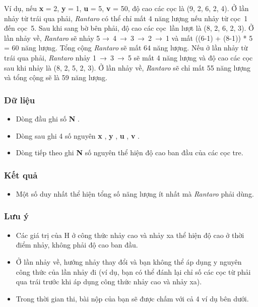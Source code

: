    Ví dụ, nếu   \textbf{    x   }   = 2,   \textbf{    y   }   = 1,   \textbf{    u   }   = 5,   \textbf{    v   }   = 50, độ cao các cọc là (9, 2, 6, 2, 4). Ở lần nhảy từ trái qua phải,   \emph{    Rantaro   }   có thể chỉ mất 4 năng lượng nếu nhảy từ cọc 1 đến cọc 5. Sau khi sang bờ bên phải, độ cao các cọc lần lượt là (8, 2, 6, 2, 3). Ở lần nhảy về,   \emph{    Rantaro   }   sẽ nhảy 5 → 4 → 3 → 2 → 1 và mất ((6-1) + (8-1)) * 5 = 60 năng lượng. Tổng cộng   \emph{    Rantaro   }   sẽ mất 64 năng lượng. Nếu ở lần nhảy từ trái qua phải,   \emph{    Rantaro   }   nhảy 1 → 3 → 5 sẽ mất 4 năng lượng và độ cao các cọc sau khi nhảy là (8, 2, 5, 2, 3). Ở lần nhảy về,   \emph{    Rantaro   }   sẽ chỉ mất 55 năng lượng và tổng cộng sẽ là 59 năng lượng.  

\subsubsection{   Dữ liệu  }
\begin{itemize}
	\item     Dòng đầu ghi số    \textbf{     N    }    .   
	\item     Dòng sau ghi 4 số nguyên    \textbf{     x    }    ,    \textbf{     y    }    ,    \textbf{     u    }    ,    \textbf{     v    }    .   
	\item     Dòng tiếp theo ghi    \textbf{     N    }    số nguyên thể hiện độ cao ban đầu của các cọc tre.   
\end{itemize}

\subsubsection{   Kết quả  }
\begin{itemize}
	\item     Một số duy nhất thể hiện tổng số năng lượng ít nhất mà    \emph{     Rantaro    }    phải dùng.   
\end{itemize}

\subsubsection{   Lưu ý  }
\begin{itemize}
	\item     Các giá trị của H ở công thức nhảy cao và nhảy xa thể hiện độ cao ở thời điểm nhảy, không phải độ cao ban đầu.   
	\item     Ở lần nhảy về, hướng nhảy thay đổi và bạn không thể áp dụng y nguyên công thức của lần nhảy đi (ví dụ, bạn có thể đánh lại chỉ số các cọc từ phải qua trái trước khi áp dụng công thức nhảy cao và nhảy xa).   
	\item     Trong thời gian thi, bài nộp của bạn sẽ được chấm với cả 4 ví dụ bên dưới.   
\end{itemize}

